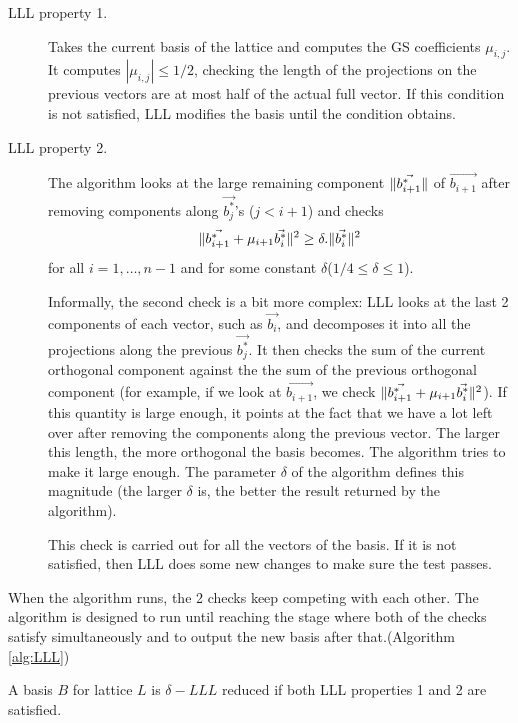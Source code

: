 \begin{description}
\item [LLL property 1.] Takes the current basis of the lattice and computes the
  GS coefficients $\mu_{i,j}$. It computes $|\mu_{i,j}| \leq 1/2$, checking the
  length of the projections on the previous vectors are at most half of the
  actual full vector. If this condition is not satisfied, LLL modifies the basis
  until the condition obtains.
\item [LLL property 2.] The algorithm looks at the large remaining component
  $\Vert \vec{b_{i+1}^*} \Vert$ of $\vec{b_{i+1}}$ after removing components along
  $\vec{b_j^*}$'s ($j < i + 1$) and checks
  \[
    \Vert \vec{b_{i+1}^*}+\mu_{i+1}\vec{b_i^*} \Vert^2 \geq \delta
    . \Vert \vec{b_i^*} \Vert^2
  \]
  for all $i=1,\dots,n-1$ and for some constant
  $\delta$($1/4 \leq \delta \leq 1$).

  Informally, the second check is a bit more complex: LLL looks at the last 2
  components of each vector, such as $\vec{b_i}$, and decomposes it
  into all the projections along the previous $\vec{b_j^*}$. It then checks the 
  sum of the current orthogonal component against the the sum of the previous orthogonal component (for example, if
  we look at $\vec{b_{i+1}}$, we check
  $\Vert \vec{b_{i+1}^*}+\mu_{i+1}\vec{b_i^*} \Vert^2$). If this quantity is large
  enough, it points at the fact that we have a lot left over after removing the
  components along the previous vector. The larger this length, the more
  orthogonal the basis becomes. The algorithm tries to make it large enough. The
  parameter $\delta$ of the algorithm defines this magnitude (the larger
  $\delta$ is, the better the result returned by the algorithm).

  This check is carried out for all the vectors of the basis. If it is not
  satisfied, then  LLL does some new changes to make sure the test passes.
\end{description}

When the algorithm runs, the 2 checks keep competing with each
other. The algorithm is designed to run until reaching the stage where both of the checks satisfy
simultaneously and to output the new basis after that.(Algorithm
\ref{alg:LLL})
\begin{definition}
  A basis $B$ for lattice $L$ is $\delta-LLL$ reduced if both LLL properties 1
  and 2 are satisfied.
  \label{def:LLL}
\end{definition}

